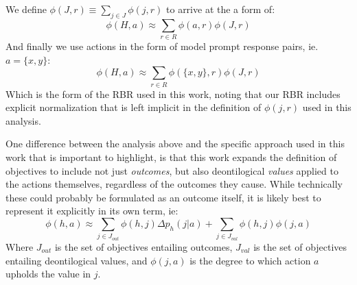 \documentclass{article}
\begin{document}
We define $\phi(J,r) \equiv \sum\limits_{j\in J} \phi(j,r)$ to arrive at the a form of:
\begin{equation}
    \phi(H,a) \approx \sum\limits_{r\in R} \phi(a,r) \phi(J,r) 
\end{equation}
And finally we use actions in the form of model prompt response pairs, ie. $a=\{x,y\}$:
\begin{equation}
    \phi(H,a) \approx \sum\limits_{r\in R} \phi(\{x,y\},r) \phi(J,r) 
\end{equation}
Which is the form of the RBR used in this work, noting that our RBR includes explicit normalization that is left implicit in the definition of $\phi(j,r)$ used in this analysis.

One difference between the analysis above and the specific approach used in this work that is important to highlight, is that this work expands the definition of objectives to include not just \emph{outcomes}, but also deontilogical \emph{values} applied to the actions themselves, regardless of the outcomes they cause. While technically these could probably be formulated as an outcome itself, it is likely best to represent it explicitly in its own term, ie:
\begin{equation}
    \phi(h,a) \approx \sum\limits_{j\in J_{out}}\phi(h,j) \Delta p_h(j|a) + \sum\limits_{j\in J_{val}}\phi(h,j)\phi(j,a)
\end{equation}
Where $J_{out}$ is the set of objectives entailing outcomes, $J_{val}$ is the set of objectives entailing deontilogical values, and $\phi(j,a)$ is the degree to which action $a$ upholds the value in $j$.
\end{document}

